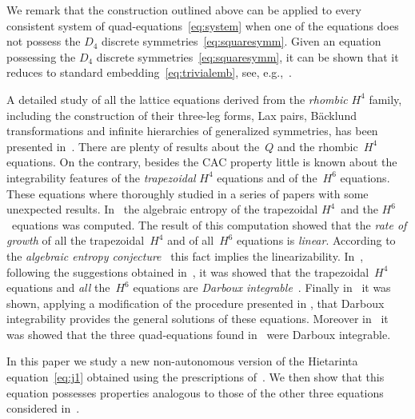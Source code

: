 \documentclass[pdftex]{sigma}
\numberwithin{equation}{section}
\newcommand{\Hvier}{$H^{4}$}
\newcommand{\Hsechs}{$H^{6}$}
\begin{document}
We remark that the construction outlined above can be applied
to every consistent system of quad-equations~\eqref{eq:system} when
one of the equations does not possess the $D_{4}$ discrete symmet\-ries~\eqref{eq:squaresymm}.
Given an equation possessing the $D_{4}$ discrete symmetries~\eqref{eq:squaresymm}, it can be shown that it reduces to standard
embedding~\eqref{eq:trivialemb}, see, e.g.,~\cite{GubbiottiPhD2017, GSL_general}.

A detailed study of all the lattice equations derived
from the \emph{rhombic} $H^{4}$
family, including the construction of their three-leg forms,
Lax pairs, B\"acklund transformations and inf\/inite hierarchies
of generalized symmetries,
has been presented in~\cite{Xenitidis2009}.
There are plenty of results about
the~$Q$ and the rhombic~$H^{4}$ equations.
On the contrary,
besides the CAC property
little is known about the integrability features
of the \emph{trapezoidal} $H^{4}$ equations
and of the~$H^{6}$ equations.
These equations where thoroughly studied
in a series of papers
\cite{GSL_general,GSL_Gallipoli15,GSL_Pavel,GSL_symmetries,GSL_QV,GSY_DarbouxII,GSY_DarbouxI}
with some unexpected results.
In~\cite{GSL_general} the algebraic entropy
\cite{BellonViallet1999,HietarintaViallet2007,Viallet2006,Viallet2009}
of the trapezoidal \Hvier\ and the \Hsechs\ equations was computed.
The result of this computation showed that the \emph{rate of growth}
of all the trapezoidal~$H^{4}$
and of all~$H^{6}$ equations is \emph{linear}.
According to the \emph{algebraic entropy conjecture}~\cite{FalquiViallet1993,HietarintaViallet2007}
this fact implies the linearizability.
In~\cite{GSY_DarbouxI}, following the suggestions obtained in~\cite{GSL_Gallipoli15,GSL_Pavel},
it was showed that the trapezoidal~$H^{4}$ equations and \emph{all} the~$H^{6}$ equations are
\emph{Darboux integrable}~\cite{AdlerStartsev1999}.
Finally in~\cite{GSY_DarbouxII} it was shown,
applying a modif\/ication of the procedure presented
in \cite{GarifullinYamilov2012},
that Darboux integrability provides the general
solutions of these equations.
Moreover in~\cite{GSL_Pavel} it was showed that
the three quad-equations found in~\cite{Hietarinta2005}
were Darboux integrable.

In this paper we study a new non-autonomous
version of the Hietarinta equation~\eqref{eq:j1}
obtained using the prescriptions of~\cite{ABS2009,Boll2011,Boll2012a,Boll2012b,Xenitidis2009}.
We then show that this equation possesses properties
analogous to those of the other three equations
considered in~\cite{Hietarinta2005}.
\end{document}
